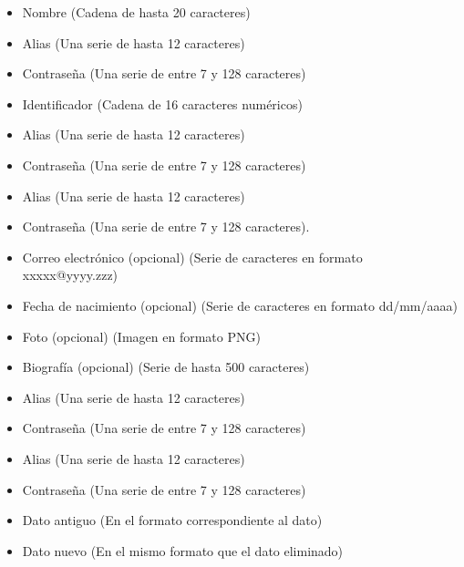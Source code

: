 \begin{itemize}
  \item Nombre (Cadena de hasta 20 caracteres)
  \item Alias (Una serie de hasta 12 caracteres)
  \item Contraseña (Una serie de entre 7 y 128 caracteres)
\end{itemize}


\begin{itemize}
  \item Identificador (Cadena de 16 caracteres numéricos)
  \item Alias (Una serie de hasta 12 caracteres)
  \item Contraseña (Una serie de entre 7 y 128 caracteres)
\end{itemize}



\begin{itemize}
\item Alias (Una serie de hasta 12 caracteres)
\item Contraseña (Una serie de entre 7 y 128 caracteres).
\item Correo electrónico (opcional) (Serie de caracteres en formato xxxxx@yyyy.zzz)
\item Fecha de nacimiento (opcional) (Serie de caracteres en formato dd/mm/aaaa)
\item Foto (opcional) (Imagen en formato PNG)
\item Biografía (opcional) (Serie de hasta 500 caracteres)
\end{itemize}

\begin{itemize}
\item Alias (Una serie de hasta 12 caracteres)
\item Contraseña (Una serie de entre 7 y 128 caracteres)
\end{itemize}

\begin{itemize}
\item Alias (Una serie de hasta 12 caracteres)
\item Contraseña (Una serie de entre 7 y 128 caracteres)
\item Dato antiguo (En el formato correspondiente al dato)
\item Dato nuevo (En el mismo formato que el dato eliminado)
\end{itemize}

